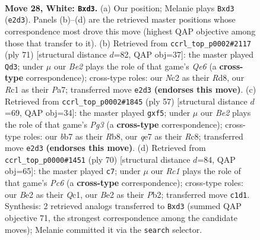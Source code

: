 \documentclass[11pt]{article}
\begin{document}
\clearpage

\begin{figure}[p]\centering
\begin{subfigure}{0.46\textwidth}\centering
\resizebox{\linewidth}{!}{%
\newchessgame
\chessboard[
  setfen={r2k2nr/1b2q3/8/4Pp2/pp3Q1p/3p3P/P1N1B1P1/2R3KR w - - 0 28},
  showmover=false,
  pgfstyle=straightmove, color=movearrow, markmove={e2-d3}
]}
\caption{}
\end{subfigure}\hfill
\begin{subfigure}{0.46\textwidth}\centering
\resizebox{\linewidth}{!}{%
\newchessgame
\chessboard[
  setfen={3rr1k1/p5np/4P1p1/1ppP1p2/8/P3q3/1B4QP/4RR1K b - - 1 36},
  showmover=false,
  pgfstyle=straightmove, color=movearrow, markmove={e3-d3}
]}
\caption{}
\end{subfigure}
\\[4pt]
\begin{subfigure}{0.46\textwidth}\centering
\resizebox{\linewidth}{!}{%
\newchessgame
\chessboard[
  setfen={1rrn4/4q1kp/pp2P1p1/4pP2/1PP5/5BP1/7P/1RRQ2K1 b - - 0 29},
  showmover=false,
  pgfstyle=straightmove, color=movearrow, markmove={g6-f5}
]}
\caption{}
\end{subfigure}\hfill
\begin{subfigure}{0.46\textwidth}\centering
\resizebox{\linewidth}{!}{%
\newchessgame
\chessboard[
  setfen={1r1qr1k1/R4pb1/1nPp2p1/R7/4PP2/1pp2p2/1P1N1BP1/2Q3K1 w - - 0 36},
  showmover=false,
  pgfstyle=straightmove, color=movearrow, markmove={c6-c7}
]}
\caption{}
\end{subfigure}
\caption{\textbf{Move 28, White: \texttt{Bxd3}.} (a) Our position; Melanie plays \texttt{Bxd3} (\texttt{e2d3}). Panels (b)--(d) are the retrieved master positions whose correspondence most drove this move (highest QAP objective among those that transfer to it). (b) Retrieved from \texttt{ccrl\_top\_p0002\#2117} (ply 71) [structural distance $d$=82, QAP obj=37]: the master played \texttt{Qd3}; under $\mu$ our \emph{Be2} plays the role of that game's \emph{Qe6} (a \textbf{cross-type} correspondence); cross-type roles: our \emph{N}c2 as their \emph{R}d8, our \emph{R}c1 as their \emph{P}a7; transferred move \texttt{e2d3} \textbf{(endorses this move)}. (c) Retrieved from \texttt{ccrl\_top\_p0002\#1845} (ply 57) [structural distance $d$=69, QAP obj=34]: the master played \texttt{gxf5}; under $\mu$ our \emph{Be2} plays the role of that game's \emph{Pg3} (a \textbf{cross-type} correspondence); cross-type roles: our \emph{b}b7 as their \emph{R}b8, our \emph{q}e7 as their \emph{R}c8; transferred move \texttt{e2d3} \textbf{(endorses this move)}. (d) Retrieved from \texttt{ccrl\_top\_p0000\#1451} (ply 70) [structural distance $d$=84, QAP obj=65]: the master played \texttt{c7}; under $\mu$ our \emph{Rc1} plays the role of that game's \emph{Pc6} (a \textbf{cross-type} correspondence); cross-type roles: our \emph{B}e2 as their \emph{Q}c1, our \emph{B}e2 as their \emph{P}b2; transferred move \texttt{c1d1}. Synthesis: 2 retrieved analogs transferred to \texttt{Bxd3} (summed QAP objective 71, the strongest correspondence among the candidate moves); Melanie committed it via the \texttt{search} selector.}
\label{fig:thought-m54}
\end{figure}
\end{document}
